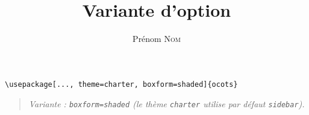 \documentclass[11pt]{ocots-book}
\title{Variante d'option}
\author{Prénom \textsc{Nom}}
\newcommand{\ocotsvariantnote}[1]{\begin{quote}\itshape Variante : #1\end{quote}}
\begin{document}
\maketitle

\begin{lstlisting}
\usepackage[..., theme=charter, boxform=shaded]{ocots}
\end{lstlisting}
\ocotsvariantnote{\texttt{boxform=shaded} (le th\`eme \texttt{charter} utilise par d\'efaut \texttt{sidebar}).}

\end{document}
